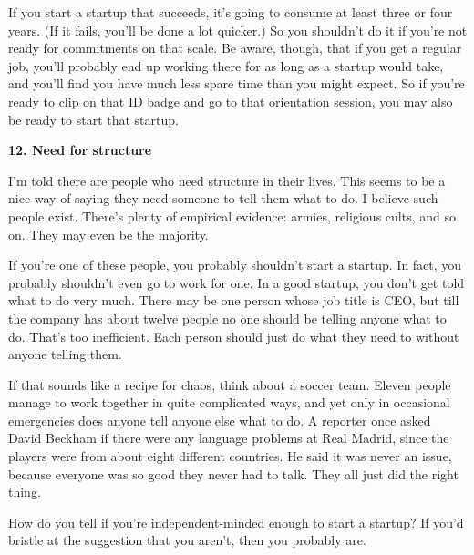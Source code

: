 If you start a startup that
                    succeeds, it's going to consume at least three or four
                    years. (If it fails, you'll be done a lot quicker.) So you
                    shouldn't do it if you're not ready for commitments on that
                    scale. Be aware, though, that if you get a regular job,
                    you'll probably end up working there for as long as a
                    startup would take, and you'll find you have much less spare
                    time than you might expect. So if you're ready to clip on
                    that ID badge and go to that orientation session, you may
                    also be ready to start that startup.

\textbf{12. Need for structure}

I'm told there are people who need structure in
                    their lives. This seems to be a nice way of saying they need
                    someone to tell them what to do. I believe such people
                    exist. There's plenty of empirical evidence: armies,
                    religious cults, and so on. They may even be the
                    majority.

If you're one of these people, you
                    probably shouldn't start a startup. In fact, you probably
                    shouldn't even go to work for one. In a good startup, you
                    don't get told what to do very much. There may be one person
                    whose job title is CEO, but till the company has about
                    twelve people no one should be telling anyone what to do.
                    That's too inefficient. Each person should just do what they
                    need to without anyone telling them.

If that
                    sounds like a recipe for chaos, think about a soccer team.
                    Eleven people manage to work together in quite complicated
                    ways, and yet only in occasional emergencies does anyone
                    tell anyone else what to do. A reporter once asked David
                    Beckham if there were any language problems at Real Madrid,
                    since the players were from about eight different countries.
                    He said it was never an issue, because everyone was so good
                    they never had to talk. They all just did the right
                    thing.

How do you tell if you're
                    independent-minded enough to start a startup? If you'd
                    bristle at the suggestion that you aren't, then you probably
                    are.

